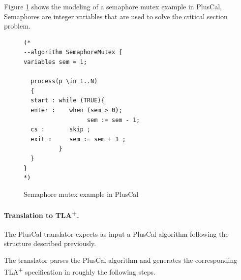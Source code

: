 \documentclass{thesul}
\newcommand{\tlaplus}{TLA\textsuperscript{+}\xspace}
\begin{document}
Figure \ref{semaphoreEx} shows the modeling of a semaphore mutex example in PlusCal, Semaphores are integer variables that are used to solve the critical section problem.

\FloatBarrier 
\begin{figure}
\begin{lstlisting}[frame = tlrb, firstnumber = 1]
(*
--algorithm SemaphoreMutex {
variables sem = 1;
 
  process(p \in 1..N)
  {
  start : while (TRUE){
  enter :    when (sem > 0);
                  sem := sem - 1;            
  cs :       skip ;
  exit :     sem := sem + 1 ;
          }
  }
}
*)

\end{lstlisting}
\caption{Semaphore mutex example in PlusCal}
\label{semaphoreEx}
\end{figure} 

\paragraph{Translation to \tlaplus.}
The PlusCal translator expects as input a PlusCal algorithm following the structure described previously.

The translator parses the PlusCal algorithm and generates the corresponding \tlaplus specification in roughly the following steps.
\end{document}
